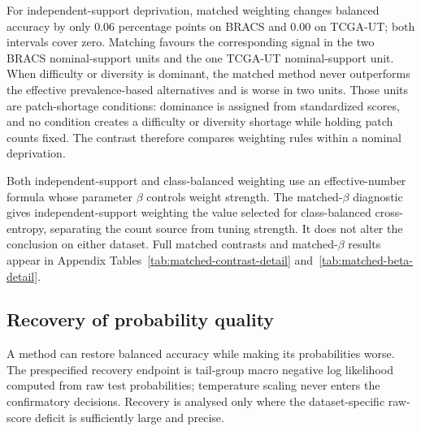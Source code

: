 \documentclass[11pt]{article}
\newcommand{\resultstable}[1]{}
\begin{document}
\begin{table}[ht]
  \centering
  \small
  \resultstable{matched_contrast_summary}
  \caption{Matched-minus-unmatched contrasts for balanced accuracy. Intervals are paired \num{95}\% bootstrap intervals.}
  \label{tab:matched-contrast}
\end{table}

\noindent For independent-support deprivation, matched weighting changes balanced accuracy by only \num{0.06} percentage points on BRACS and \num{0.00} on TCGA-UT; both intervals cover zero. Matching favours the corresponding signal in the two BRACS nominal-support units and the one TCGA-UT nominal-support unit. When difficulty or diversity is dominant, the matched method never outperforms the effective prevalence-based alternatives and is worse in two units. Those units are patch-shortage conditions: dominance is assigned from standardized scores, and no condition creates a difficulty or diversity shortage while holding patch counts fixed. The contrast therefore compares weighting rules within a nominal deprivation.

Both independent-support and class-balanced weighting use an effective-number formula whose parameter $\beta$ controls weight strength. The matched-$\beta$ diagnostic gives independent-support weighting the value selected for class-balanced cross-entropy, separating the count source from tuning strength. It does not alter the conclusion on either dataset. Full matched contrasts and matched-$\beta$ results appear in Appendix Tables~\ref{tab:matched-contrast-detail} and~\ref{tab:matched-beta-detail}.

\subsection{Recovery of probability quality}
\label{sec:rq2-calibration}
A method can restore balanced accuracy while making its probabilities worse. The prespecified recovery endpoint is tail-group macro negative log likelihood computed from raw test probabilities; temperature scaling never enters the confirmatory decisions. Recovery is analysed only where the dataset-specific raw-score deficit is sufficiently large and precise.

\begin{table}[ht]
  \centering
  \small
  \resultstable{calibration_recovery_summary}
  \caption{Recovery of tail-group probability quality. Recovery is the percentage of the original negative-log-likelihood deficit.}
  \label{tab:calibration-recovery}
\end{table}
\end{document}
